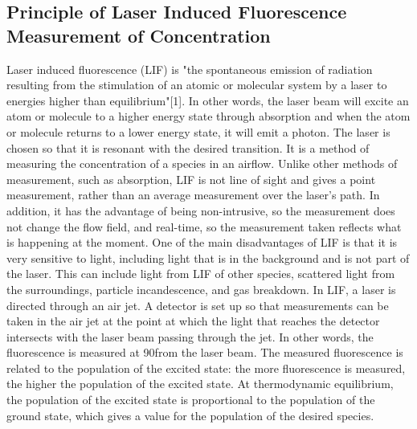 \documentclass{article}
\begin{document}
\subsection*{Principle of Laser Induced Fluorescence Measurement of Concentration}
\indent Laser induced fluorescence (LIF) is "the spontaneous emission of radiation resulting from the stimulation of an atomic or molecular system by a laser to energies higher than equilibrium"[1].  In other words, the laser beam will excite an atom or molecule to a higher energy state through absorption and when the atom or molecule returns to a lower energy state, it will emit a photon.  The laser is chosen so that it is resonant with the desired transition.  It is a method of measuring the concentration of a species in an airflow.  Unlike other methods of measurement, such as absorption, LIF is not line of sight and gives a point measurement, rather than an average measurement over the laser's path.  In addition, it has the advantage of being non-intrusive, so the measurement does not change the flow field, and real-time, so the measurement taken reflects what is happening at the moment. One of the main disadvantages of LIF is that it is very sensitive to light, including light that is in the background and is not part of the laser.  This can include light from LIF of other species, scattered light from the surroundings, particle incandescence, and gas breakdown. \newline
\indent In LIF, a laser is directed through an air jet.  A detector is set up so that measurements can be taken in the air jet at the point at which the light that reaches the detector intersects with the laser beam passing through the jet. In other words, the fluorescence is measured at 90\degree  from the laser beam.  The measured fluorescence is related to the population of the excited state: the more fluorescence is measured, the higher the population of the excited state.  At thermodynamic equilibrium, the population of the excited state is proportional to the population of the ground state, which gives a value for the population of the desired species.
\end{document}
